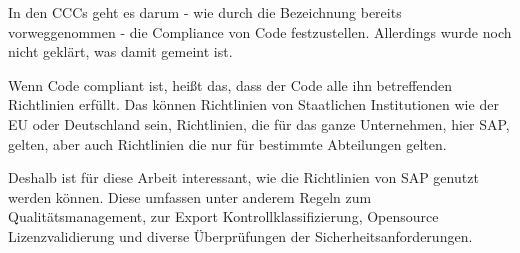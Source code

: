 \documentclass[../main.tex]{subfiles}
\begin{document}
In den \glspl{CCC} geht es darum - wie durch die Bezeichnung bereits vorweggenommen - die Compliance von Code festzustellen. Allerdings wurde noch nicht geklärt, was damit gemeint ist.

Wenn Code compliant ist, heißt das, dass der Code alle ihn betreffenden Richtlinien erfüllt.
Das können Richtlinien von Staatlichen Institutionen wie der \gls{EU} oder Deutschland sein, Richtlinien, die für das ganze Unternehmen, hier SAP, gelten, aber auch Richtlinien die nur für bestimmte Abteilungen gelten.

Deshalb ist für diese Arbeit interessant, wie die Richtlinien von SAP genutzt werden können.
Diese umfassen unter anderem Regeln zum Qualitätsmanagement, zur Export Kontrollklassifizierung, Opensource Lizenzvalidierung und diverse Überprüfungen der Sicherheitsanforderungen.
\end{document}
